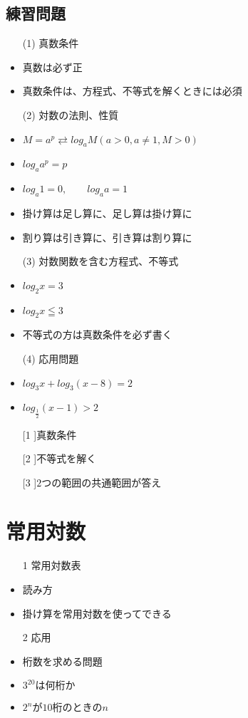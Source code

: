 \documentclass[12pt]{jarticle}
\begin{document}
\subsection{練習問題}
\begin{itemize}
  \item[(1)]真数条件
  \item 真数は必ず正
  \item 真数条件は、方程式、不等式を解くときには必須
  \item [(2)]対数の法則、性質
  \item $\displaystyle M = a^p  \rightleftarrows log_a M (a>0,a \neq 1, M>0)$
  \item $\displaystyle log_a a^p = p$
  \item $\displaystyle log_a 1 = 0, \qquad log_a a = 1$
  \item 掛け算は足し算に、足し算は掛け算に
  \item 割り算は引き算に、引き算は割り算に
  \item [(3)]対数関数を含む方程式、不等式
  \item $\displaystyle log_2 x = 3$
  \item $\displaystyle log_2 x \leqq 3$
  \item 不等式の方は真数条件を必ず書く
  \item [(4)]応用問題
  \item $\displaystyle log_3 x + log_3(x-8) = 2$
  \item $\displaystyle log_{\frac{1}{2}} (x-1) > 2$
  \item [[1]]真数条件
  \item [[2]]不等式を解く
  \item [[3]]$2$つの範囲の共通範囲が答え
\end{itemize}
\section{常用対数}
\begin{itemize}
  \item [1]常用対数表
  \item 読み方
  \item 掛け算を常用対数を使ってできる
  \item [2]応用
  \item 桁数を求める問題
  \item $\displaystyle 3^{20}は何桁か$
  \item $\displaystyle 2^n $が$10$桁のときの$n$
\end{itemize}
\end{document}
